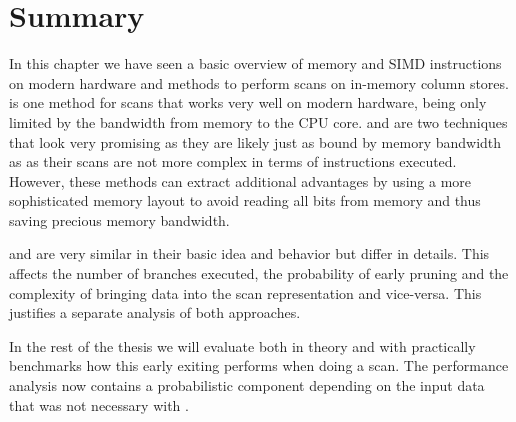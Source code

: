 \section{Summary}

In this chapter we have seen a basic overview of memory and SIMD instructions on
modern hardware and methods to perform scans on in-memory column stores.
\simdscan{} is one method for scans that works very well on modern hardware,
being only limited by the bandwidth from memory to the CPU core. \bwv{} and
\bs{} are two techniques that look very promising as they are likely just as
bound by memory bandwidth as \simdscan{} as their scans are not more complex in
terms of instructions executed. However, these methods can extract additional
advantages by using a more sophisticated memory layout to avoid reading all bits
from memory and thus saving precious memory bandwidth.

\bwv{} and \bs{} are very similar in their basic idea and behavior but differ in
details. This affects the number of branches executed, the probability of early
pruning and the complexity of bringing data into the scan representation and
vice-versa. This justifies a separate analysis of both approaches.

In the rest of the thesis we will evaluate both in theory and with practically
benchmarks how this early exiting performs when doing a scan. The performance
analysis now contains a probabilistic component depending on the input data that
was not necessary with \simdscan{}.
